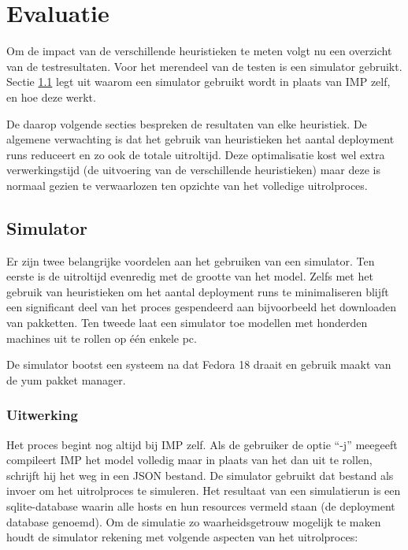 
\chapter{Evaluatie}
\label{sec:evaluatie}
Om de impact van de verschillende heuristieken te meten volgt nu een overzicht van de testresultaten.
Voor het merendeel van de testen is een simulator gebruikt.
Sectie \ref{sec:simulator} legt uit waarom een simulator gebruikt wordt in plaats van IMP zelf, en hoe deze werkt.

De daarop volgende secties bespreken de resultaten van elke heuristiek. 
De algemene verwachting is dat het gebruik van heuristieken het aantal deployment runs reduceert en zo ook de totale uitroltijd.
Deze optimalisatie kost wel extra verwerkingstijd (de uitvoering van de verschillende heuristieken) maar deze is normaal gezien te verwaarlozen ten opzichte van het volledige uitrolproces. 

\section{Simulator}
\label{sec:simulator}
Er zijn twee belangrijke voordelen aan het gebruiken van een simulator.
Ten eerste is de uitroltijd evenredig met de grootte van het model.
Zelfs met het gebruik van heuristieken om het aantal deployment runs te minimaliseren blijft een significant deel van het proces gespendeerd aan bijvoorbeeld het downloaden van pakketten. 
Ten tweede laat een simulator toe modellen met honderden machines uit te rollen op \'e\'en enkele pc.

De simulator bootst een systeem na dat Fedora 18 draait en gebruik maakt van de yum pakket manager.

\subsection{Uitwerking}
\label{simulator:uitwerking}
Het proces begint nog altijd bij IMP zelf.
Als de gebruiker de optie ``-j'' meegeeft compileert IMP het model volledig maar in plaats van het dan uit te rollen, schrijft hij het weg in een JSON bestand.
De simulator gebruikt dat bestand als invoer om het uitrolproces te simuleren.
Het resultaat van een simulatierun is een sqlite-database waarin alle hosts en hun resources vermeld staan (de deployment database genoemd).
Om de simulatie zo waarheidsgetrouw mogelijk te maken houdt de simulator rekening met volgende aspecten van het uitrolproces:

